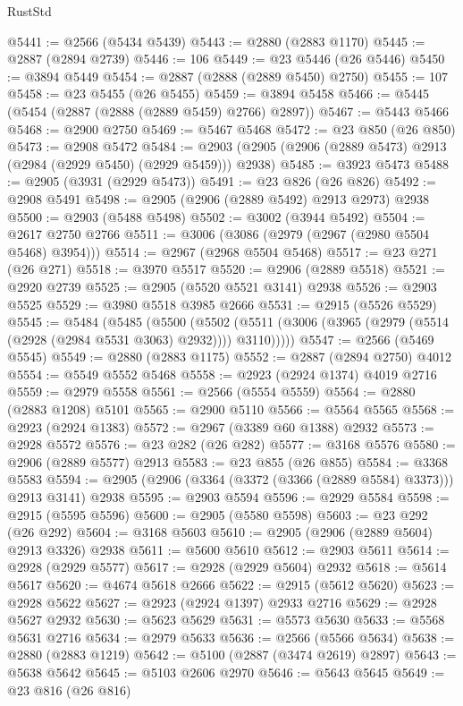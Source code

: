 \begin{lexlean}{RustStd}
\begin{coremodule}
@5441 := @2566 (@5434 @5439)
@5443 := @2880 (@2883 @1170)
@5445 := @2887 (@2894 @2739)
@5446 := 106
@5449 := @23 @5446 (@26 @5446)
@5450 := @3894 @5449
@5454 := @2887 (@2888 (@2889 @5450) @2750)
@5455 := 107
@5458 := @23 @5455 (@26 @5455)
@5459 := @3894 @5458
@5466 := @5445 (@5454 (@2887 (@2888 (@2889 @5459) @2766) @2897))
@5467 := @5443 @5466
@5468 := @2900 @2750
@5469 := @5467 @5468
@5472 := @23 @850 (@26 @850)
@5473 := @2908 @5472
@5484 := @2903 (@2905 (@2906 (@2889 @5473) @2913 (@2984 (@2929 @5450) (@2929 @5459))) @2938)
@5485 := @3923 @5473
@5488 := @2905 (@3931 (@2929 @5473))
@5491 := @23 @826 (@26 @826)
@5492 := @2908 @5491
@5498 := @2905 (@2906 (@2889 @5492) @2913 @2973) @2938
@5500 := @2903 (@5488 @5498)
@5502 := @3002 (@3944 @5492)
@5504 := @2617 @2750 @2766
@5511 := @3006 (@3086 (@2979 (@2967 (@2980 @5504 @5468) @3954)))
@5514 := @2967 (@2968 @5504 @5468)
@5517 := @23 @271 (@26 @271)
@5518 := @3970 @5517
@5520 := @2906 (@2889 @5518)
@5521 := @2920 @2739
@5525 := @2905 (@5520 @5521 @3141) @2938
@5526 := @2903 @5525
@5529 := @3980 @5518 @3985 @2666
@5531 := @2915 (@5526 @5529)
@5545 := @5484
    (@5485
      (@5500
        (@5502 (@5511 (@3006 (@3965 (@2979 (@5514 (@2928 (@2984 @5531 @3063) @2932)))) @3110)))))
@5547 := @2566 (@5469 @5545)
@5549 := @2880 (@2883 @1175)
@5552 := @2887 (@2894 @2750) @4012
@5554 := @5549 @5552 @5468
@5558 := @2923 (@2924 @1374) @4019 @2716
@5559 := @2979 @5558
@5561 := @2566 (@5554 @5559)
@5564 := @2880 (@2883 @1208) @5101
@5565 := @2900 @5110
@5566 := @5564 @5565
@5568 := @2923 (@2924 @1383)
@5572 := @2967 (@3389 @60 @1388) @2932
@5573 := @2928 @5572
@5576 := @23 @282 (@26 @282)
@5577 := @3168 @5576
@5580 := @2906 (@2889 @5577) @2913
@5583 := @23 @855 (@26 @855)
@5584 := @3368 @5583
@5594 := @2905 (@2906 (@3364 (@3372 (@3366 (@2889 @5584) @3373))) @2913 @3141) @2938
@5595 := @2903 @5594
@5596 := @2929 @5584
@5598 := @2915 (@5595 @5596)
@5600 := @2905 (@5580 @5598)
@5603 := @23 @292 (@26 @292)
@5604 := @3168 @5603
@5610 := @2905 (@2906 (@2889 @5604) @2913 @3326) @2938
@5611 := @5600 @5610
@5612 := @2903 @5611
@5614 := @2928 (@2929 @5577)
@5617 := @2928 (@2929 @5604) @2932
@5618 := @5614 @5617
@5620 := @4674 @5618 @2666
@5622 := @2915 (@5612 @5620)
@5623 := @2928 @5622
@5627 := @2923 (@2924 @1397) @2933 @2716
@5629 := @2928 @5627 @2932
@5630 := @5623 @5629
@5631 := @5573 @5630
@5633 := @5568 @5631 @2716
@5634 := @2979 @5633
@5636 := @2566 (@5566 @5634)
@5638 := @2880 (@2883 @1219)
@5642 := @5100 (@2887 (@3474 @2619) @2897)
@5643 := @5638 @5642
@5645 := @5103 @2606 @2970
@5646 := @5643 @5645
@5649 := @23 @816 (@26 @816)

\end{coremodule}
\end{lexlean}
